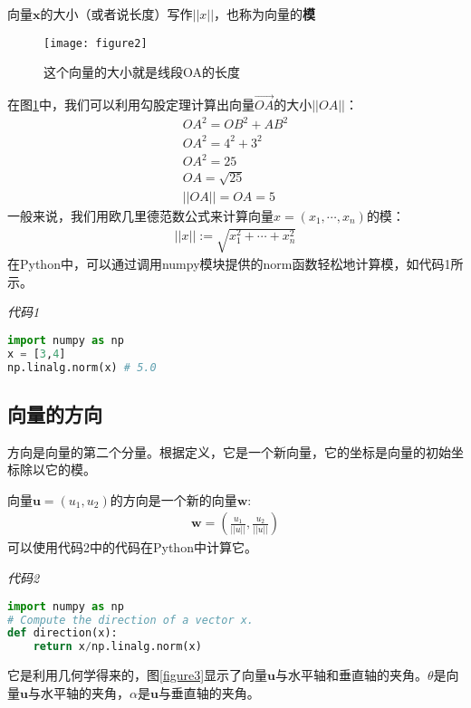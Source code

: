 向量$\mathbf{x}$的大小（或者说长度）写作$||x||$，也称为向量的\textbf{模}

\begin{figure}[ht]
    \centering
    \texttt{[image: figure2]}
    \caption{这个向量的大小就是线段OA的长度}
    \label{figure2}
\end{figure}

在图\ref{figure2}中，我们可以利用勾股定理计算出向量$\vec{OA}$的大小$||OA||$：
\begin{gather*}
OA^2 = OB^2+AB^2 \\
OA^2=4^2+3^2 \\
OA^2=25 \\
OA=\sqrt{25} \\
||OA||=OA=5
\end{gather*}
一般来说，我们用欧几里德范数公式来计算向量$x=(x_1,\cdots,x_n)$的模：
\begin{gather*}
||x||:= \sqrt{x_1^2+\cdots+x_n^2}
\end{gather*}
在Python中，可以通过调用numpy模块提供的norm函数轻松地计算模，如代码1所示。

\emph{代码1}

\begin{lstlisting}[language=python]
import numpy as np 
x = [3,4] 
np.linalg.norm(x) # 5.0
\end{lstlisting}

\subsection{向量的方向}

方向是向量的第二个分量。根据定义，它是一个新向量，它的坐标是向量的初始坐标除以它的模。

向量$\mathbf{u}=(u_1,u_2)$的方向是一个新的向量$\mathbf{w}$:
\begin{gather*}
\mathbf{w} = (\frac{u_1}{||u||},\frac{u_2}{||u||})
\end{gather*}
可以使用代码2中的代码在Python中计算它。

\emph{代码2}

\begin{lstlisting}[language=python]
import numpy as np 
# Compute the direction of a vector x. 
def direction(x): 
    return x/np.linalg.norm(x)
\end{lstlisting}

它是利用几何学得来的，图\ref{figure3}显示了向量$\mathbf{u}$与水平轴和垂直轴的夹角。$\theta$是向量$\mathbf{u}$与水平轴的夹角，$\alpha$是$\mathbf{u}$与垂直轴的夹角。

